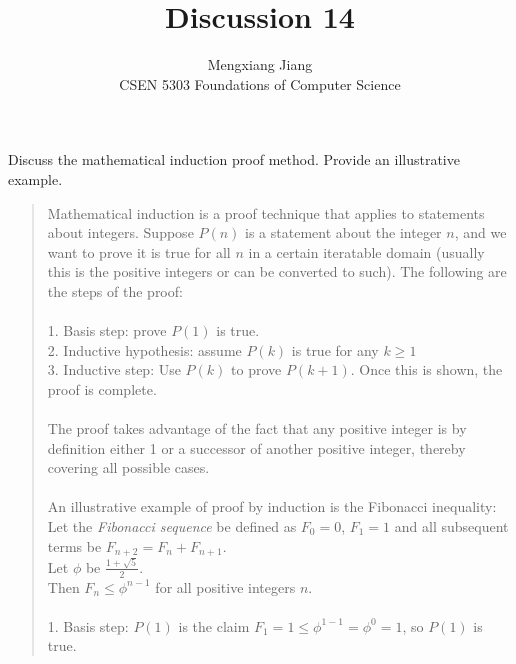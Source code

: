 \documentclass[12pt]{article}
\newenvironment{problem}[2][Problem]{\begin{trivlist}
\item[\hskip \labelsep {\bfseries #1}\hskip \labelsep {\bfseries #2.}]}{\end{trivlist}}
\begin{document}
 
 
\title{Discussion 14}%
\author{Mengxiang Jiang\\ %
CSEN 5303 Foundations of Computer Science} %
 
\maketitle

\begin{problem}{statement}
    Discuss the mathematical induction proof method. Provide an illustrative example.
    \begin{quote}
        Mathematical induction is a proof technique that applies to statements about integers. 
        Suppose $P(n)$ is a statement about the integer $n$, 
        and we want to prove it is true for all $n$ in a certain iteratable domain 
        (usually this is the positive integers or can be converted to such).
        The following are the steps of the proof:\\\\
        1. Basis step: prove $P(1)$ is true.\\
        2. Inductive hypothesis: assume $P(k)$ is true for any $k \geq 1$\\
        3. Inductive step: Use $P(k)$ to prove $P(k+1)$. Once this is shown, the proof is complete.\\\\
        The proof takes advantage of the fact that any positive integer is by definition either 1 
        or a successor of another positive integer, thereby covering all possible cases.\\\\
        An illustrative example of proof by induction is the Fibonacci inequality:
        Let the \emph{Fibonacci sequence} be defined as $F_0 = 0$, $F_1 = 1$ and all subsequent terms be $F_{n+2} = F_n + F_{n+1}$.\\
        Let $\phi$ be $\frac{1+\sqrt{5}}{2}$.\\
        Then $F_n \leq \phi^{n-1}$ for all positive integers $n$.\\\\
        1. Basis step: $P(1)$ is the claim $F_1 = 1 \leq \phi^{1-1} = \phi^0 = 1$, so $P(1)$ is true.\\

\end{quote}
\end{problem}
\end{document}
